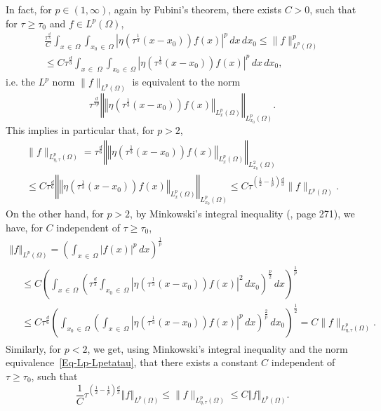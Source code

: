 \documentclass[AHL,Unicode,longabstracts]{cedram}
\newcommand{\norm}[1]{\left\Vert#1\right\Vert}
\renewcommand{\leq}{\leqslant}
\renewcommand{\geq}{\geqslant}
\begin{document}
In fact, for $p \in (1, \infty) $, again by Fubini's theorem, there exists $C>0$, such that for $\tau\geq \tau_0$ and $f \in L^p(\Omega)$,
\begin{multline}
\frac{\tau^{\frac{d}{3}}}{C} \int_{x\,\in\,\Omega} \int_{x_0\,\in\,\Omega} \left|\eta\left(\tau^{\frac{1}{3}}(x-x_0)\right) f(x)\right|^p \, dx \, dx_0
\leq\|f \|_{L^p(\Omega)}^p \\ \leq C \tau^{\frac{d}{3}} \int_{x\,\in\,\,\Omega} \int_{x_0\,\in\,\Omega} \left|\eta\left(\tau^{\frac{1}{3}}(x-x_0)\right) f(x)\right|^p \, dx \, dx_0,\label{Eq-Lp-Lpetatau}
\end{multline}
i.e. the $L^p$ norm $\| f \|_{L^p(\Omega)}$ is equivalent to the norm
\[
\tau^{\frac{d}{3p}} \norm{\norm{ \eta\left(\tau^{\frac{1}{3}} (x-x_0)\right) f(x) }_{L^p_x(\Omega)}}_{L^p_{x_0} (\Omega)}.
\]
This implies in particular that, for $p>2$,
\begin{multline}\label{Lp-larger-Lpetatau}
\| f \| _{L^{p}_{\eta, \tau}(\Omega)} = \tau^{\frac{d}{6}} \norm{\norm{ \eta\left(\tau^{\frac{1}{3}} (x-x_0)\right) f(x) }_{L^p_x(\Omega)}}_{L^2_{x_0} (\Omega)}
\\
\leq C \tau^{\frac{d}{6}} \norm{\norm{ \eta\left(\tau^{\frac{1}{3}} (x-x_0)\right) f(x) }_{L^p_x(\Omega)}}_{L^p_{x_0} (\Omega)}
\leq C \tau^{\left(\frac{1}{2} - \frac{1}{p}\right) \frac{d}{3}} \| f\|_{L^p(\Omega)}.
\end{multline}
On the other hand, for $p>2$, by Minkowski’s integral inequality (\cite{stein2016singular}, page 271), we have, for $C$ independent of $\tau \geq \tau_0$,
\begin{multline}\label{Lp-smaller-Lpetatau}
\norm{f}_{L^{p} (\Omega) } = \left(\int_{x\,\in \,\Omega} |f(x)|^p \, dx\right)^{\frac{1}{p}}
\\
\begin{aligned}
&\leq C \left(\int_{x\,\in\,\Omega} \left(\tau^{\frac{d}{3}} \int_{x_0\,\in\,\Omega}  \left|\eta\left(\tau^{\frac{1}{3}} (x-x_0)\right) f(x) \right|^{2} \, dx_0 \right)^{\frac{p}{2}} \, dx \right)^{\frac{1}{p}}
\\
&\leq C
\tau^{\frac{d}{6}} \left(\int_{x_0 \,\in\, \Omega} \left(\int_{x\,\in\,\Omega} \left| \eta\left(\tau^{\frac{1}{3}} (x-x_0)\right) f(x) \right|^{p} \, dx \right)^{\frac{2}{p}} \, dx_0 \right)^{\frac{1}{2}} = C \| f \| _{L^{p}_{\eta, \tau}(\Omega)}.
\end{aligned}
\end{multline}
Similarly, for $p<2$, we get, using Minkowski's integral inequality and the norm equivalence~\eqref{Eq-Lp-Lpetatau}, that there exists a constant $C$ independent of $\tau \geq \tau_0$, such that
\begin{equation}\label{Lp-eq-Lpetatau}
\frac{1}{C} \tau^{\left(\frac{1}{2} - \frac{1}{p}\right)\frac{d}{3}} \norm{ f }_{L^{p}(\Omega)}\leq \| f \| _{L^{p}_{\eta, \tau}(\Omega)} \leq C \norm{ f }_{L^{p}(\Omega)}.
\end{equation}
\end{document}
